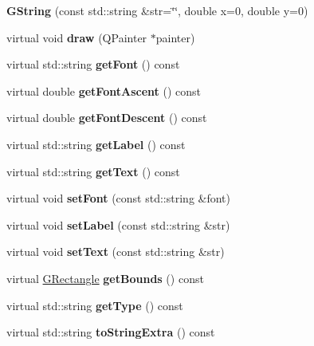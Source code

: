 \begin{DoxyCompactItemize}
\item 
\mbox{\label{classGString_acfb39d3761d3cf4d94b954b7c6984a8c}} 
{\bfseries G\+String} (const std\+::string \&str=\char`\"{}\char`\"{}, double x=0, double y=0)
\item 
\mbox{\label{classGString_ae732ae668aa5d19ff68c746471a80b63}} 
virtual void {\bfseries draw} (Q\+Painter $\ast$painter)
\item 
\mbox{\label{classGString_a94ea754880944627c82073a643e5ef7c}} 
virtual std\+::string {\bfseries get\+Font} () const
\item 
\mbox{\label{classGString_a57d797a6891f279a6b0917e0e73743dd}} 
virtual double {\bfseries get\+Font\+Ascent} () const
\item 
\mbox{\label{classGString_a4f99373d05873a913fa298ac30175505}} 
virtual double {\bfseries get\+Font\+Descent} () const
\item 
\mbox{\label{classGString_a06bdfe98fb0198a8728ea8d350d231a0}} 
virtual std\+::string {\bfseries get\+Label} () const
\item 
\mbox{\label{classGString_a1bc33b78453148f6ee907235346a83d1}} 
virtual std\+::string {\bfseries get\+Text} () const
\item 
\mbox{\label{classGString_a8e8aa5c27603126496bd91df0b414b10}} 
virtual void {\bfseries set\+Font} (const std\+::string \&font)
\item 
\mbox{\label{classGString_aaec3f3e1a76277259f3cbe2767498361}} 
virtual void {\bfseries set\+Label} (const std\+::string \&str)
\item 
\mbox{\label{classGString_a6179e1226cbe60f3eb9a27a97e3fcd6c}} 
virtual void {\bfseries set\+Text} (const std\+::string \&str)
\item 
\mbox{\label{classGString_af5d5ac1b97bdc7e6e8daf360e8c0ff41}} 
virtual \mbox{\hyperlink{classGRectangle}{G\+Rectangle}} {\bfseries get\+Bounds} () const
\item 
\mbox{\label{classGString_a633ee623139fba3f7fcfccf12aa7e8bb}} 
virtual std\+::string {\bfseries get\+Type} () const
\item 
\mbox{\label{classGString_a19ff978aea4053ac46b806b60a135d0e}} 
virtual std\+::string {\bfseries to\+String\+Extra} () const
\end{DoxyCompactItemize}
